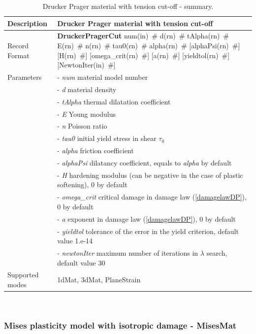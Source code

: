 \documentclass[a4paper]{article}
\newcommand{\descitem}[1]{{\noindent \bf #1}}
\newcommand{\elemparam}[2]{{{#1\tiny (#2)}~\#}}
\newcommand{\param}[1]{{\it #1}}
\newenvironment{mmt}{\begin{tabular}{|l|p{9cm}|}}{\end{tabular}\\}
\newenvironment{mmt}{\begin{tabular}{|l|l|}}{\end{tabular}\\}
\begin{document}
\begin{table}[!htb]
\begin{mmt}
\hline
Description & Drucker Prager material with tension cut-off\\
\hline
Record Format & \descitem{DruckerPragerCut} \elemparam{num}{in}
\elemparam{d}{rn} \elemparam{tAlpha}{rn} \elemparam{E}{rn} \elemparam{n}{rn} \elemparam{tau0}{rn} \elemparam{alpha}{rn} [\elemparam{alphaPsi}{rn}] [\elemparam{H}{rn}] [\elemparam{omega\_crit}{rn}] [\elemparam{a}{rn}] [\elemparam{yieldtol}{rn}] [\elemparam{NewtonIter}{in}]\\
Parameters &- \param{num} material model number\\
&- \param{d} material density\\
&- \param{tAlpha} thermal dilatation coefficient\\
&- \param{E} Young modulus\\
&- \param{n} Poisson ratio\\
&- \param{tau0} initial yield stress in shear $\tau_0$\\
&- \param{alpha} friction coefficient\\
&- \param{alphaPsi} dilatancy coefficient, equals to \param{alpha} by default\\
&- \param{H} hardening modulus (can be negative in the case of plastic softening), 0 by default\\ 
&- \param{omega\_crit} critical damage in damage law (\ref{damagelawDP}), 0 by default\\
&- \param{a} exponent in damage law (\ref{damagelawDP}), 0 by default\\
&- \param{yieldtol} tolerance of the error in the yield criterion, default value
1.e-14\\
&- \param{newtonIter} maximum number of iterations in $\lambda$ search, default value 30\\
Supported modes& 1dMat, 3dMat, PlaneStrain\\
\hline
\end{mmt}
\caption{Drucker Prager material with tension cut-off - summary.}
\label{DP_table_cut}
\end{table}

\clearpage
\subsubsection{Mises plasticity model with isotropic damage - MisesMat}
\label{sec:misplast}
\end{document}
